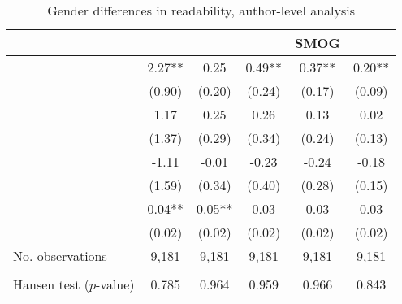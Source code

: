 \begin{table}
    \footnotesize
    \centering
    \begin{threeparttable}
        \caption{Gender differences in readability, author-level analysis}
        \label{table4_FemRatio}
        \begin{tabular}{p{4cm}S@{}S@{}S@{}S@{}S@{}}
            \toprule
            &{}&{}&{}&{SMOG}&{}\\
            \midrule
            &        2.27** &        0.25   &        0.49** &        0.37** &        0.20** \\
                                          &      (0.90)   &      (0.20)   &      (0.24)   &      (0.17)   &      (0.09)   \\
            &        1.17   &        0.25   &        0.26   &        0.13   &        0.02   \\
                                          &      (1.37)   &      (0.29)   &      (0.34)   &      (0.24)   &      (0.13)   \\
            &       -1.11   &       -0.01   &       -0.23   &       -0.24   &       -0.18   \\
                                          &      (1.59)   &      (0.34)   &      (0.40)   &      (0.28)   &      (0.15)   \\
            &        0.04** &        0.05** &        0.03   &        0.03   &        0.03   \\
                                          &      (0.02)   &      (0.02)   &      (0.02)   &      (0.02)   &      (0.02)   \\
            \midrule
            No. observations     &       9,181   &       9,181   &       9,181   &       9,181   &       9,181   \\
             \\
            \quad Hansen test (\(p\)-value)&       0.785   &       0.964   &       0.959   &       0.966   &       0.843   \\

\end{tabular}
\end{threeparttable}
\end{table}
